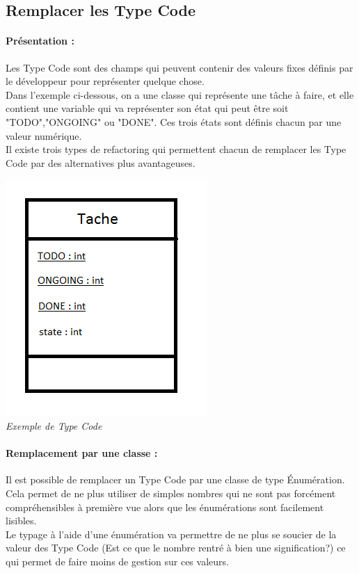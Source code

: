 \documentclass[a4paper,twoside,12pt,openright]{report}
\begin{document}
\newpage

\subsection{Remplacer les Type Code}
\paragraph{Présentation :}
Les Type Code sont des champs qui peuvent contenir des valeurs fixes définis par le développeur pour représenter quelque chose.\\
Dans l'exemple ci-dessous, on a une classe qui représente une tâche à faire, et elle contient une variable qui va représenter son état qui peut être soit "TODO","ONGOING" ou "DONE". Ces trois états sont définis chacun par une valeur numérique.\\
Il existe trois types de refactoring qui permettent chacun de remplacer les Type Code par des alternatives plus avantageuses.

\begin{center}
\includegraphics[scale=1]{Image/TypeCode.png}\\
\itshape{Exemple de Type Code}
\end{center}

\paragraph{Remplacement par une classe :}
Il est possible de remplacer un Type Code par une classe de type Énumération.\\
Cela permet de ne plus utiliser de simples nombres qui ne sont pas forcément compréhensibles à première vue alors que les énumérations sont facilement lisibles.\\
Le typage à l'aide d'une énumération va permettre de ne plus se soucier de la valeur des Type Code (Est ce que le nombre rentré à bien une signification?) ce qui permet de faire moins de gestion sur ces valeurs.
\end{document}
